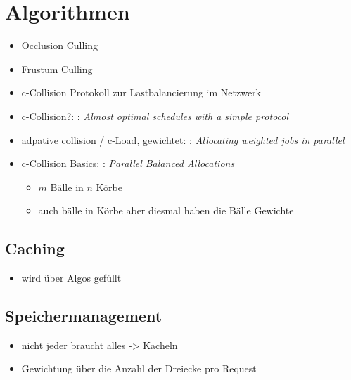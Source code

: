 \section{Algorithmen}
\label{sec:basics:algorithmen}
\begin{itemize}
 \item Occlusion Culling \cite{RTR3}
 \item Frustum Culling \cite{RTR3}
 \item c-Collision Protokoll zur Lastbalancierung im Netzwerk
 \item c-Collision?: \cite{DBLP:conf/arcs/RehbergS99}: \textit{Almost optimal schedules with a simple protocol}
 \item adpative collision / c-Load, gewichtet: \cite{ccol2}: \textit{Allocating weighted jobs in parallel}
 \item c-Collision Basics: \cite{ccol3}: \textit{Parallel Balanced Allocations}
 \begin{itemize}
  \item $m$ Bälle in $n$ Körbe
 \end{itemize}
%
 \begin{itemize}
  \item auch bälle in Körbe aber diesmal haben die Bälle Gewichte
 \end{itemize}

\end{itemize}

\subsection{Caching}
\label{sec:basics:caching}
\begin{itemize}
 \item wird über Algos gefüllt
\end{itemize}

\subsection{Speichermanagement}
\label{sec:basics:speichermanagement}
\begin{itemize}
 \item nicht jeder braucht alles -> Kacheln
 \item Gewichtung über die Anzahl der Dreiecke pro Request
\end{itemize}
